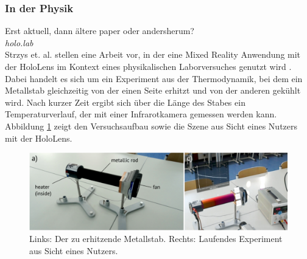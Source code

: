 \subsubsection{In der Physik}
Erst aktuell, dann ältere paper oder andersherum?\\

\vspace{4px}
\textit{holo.lab}\\
Strzys et. al. stellen eine Arbeit vor, in der eine Mixed Reality Anwendung mit der HoloLens im Kontext eines physikalischen Laborversuches genutzt wird \cite{Strzys17}. Dabei handelt es sich um ein Experiment aus der Thermodynamik, bei dem ein Metallstab gleichzeitig von der einen Seite erhitzt und von der anderen gekühlt wird. Nach kurzer Zeit ergibt sich über die Länge des Stabes ein Temperaturverlauf, der mit einer Infrarotkamera gemessen werden kann. Abbildung \ref{img:Strzys17} zeigt den Versuchsaufbau sowie die Szene aus Sicht eines Nutzers mit der HoloLens.\\

\begin{figure}[h!]
	\centering
	\includegraphics[width=1\textwidth]{images/Strzys18.png}
	\caption{Links: Der zu erhitzende Metallstab. Rechts: Laufendes Experiment aus Sicht eines Nutzers. \cite{Strzys17}}
	\label{img:Strzys17}
\end{figure}

